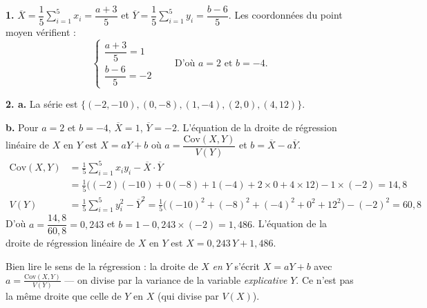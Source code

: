\documentclass[11pt]{article}
\begin{document}


\textbf{1.} $\overline{X} = \dfrac{1}{5}\displaystyle\sum_{i=1}^5 x_i = \dfrac{a + 3}{5}$ et $\overline{Y} = \dfrac{1}{5}\displaystyle\sum_{i=1}^5 y_i = \dfrac{b - 6}{5}$. Les coordonnées du point moyen vérifient :
\[ \begin{cases} \dfrac{a + 3}{5} = 1 \\[1ex] \dfrac{b - 6}{5} = -2 \end{cases} \qquad \text{D'où } a = 2 \text{ et } b = -4. \]

\textbf{2. a.} La série est $\{(-2, -10), (0, -8), (1, -4), (2, 0), (4, 12)\}$.
\begin{center}
\end{center}

\textbf{b.} Pour $a = 2$ et $b = -4$, $\overline{X} = 1$, $\overline{Y} = -2$. L'équation de la droite de régression linéaire de $X$ en $Y$ est $X = aY + b$ où $a = \dfrac{\mathrm{Cov}(X, Y)}{V(Y)}$ et $b = \overline{X} - a\overline{Y}$.
\begin{align*}
\mathrm{Cov}(X, Y) &= \frac{1}{5}\sum_{i=1}^5 x_i y_i - \overline{X}\cdot\overline{Y} \\
&= \frac{1}{5}\big((-2)(-10) + 0(-8) + 1(-4) + 2 \times 0 + 4 \times 12\big) - 1 \times (-2) = 14{,}8 \\
V(Y) &= \frac{1}{5}\sum_{i=1}^5 y_i^2 - \overline{Y}^2 = \frac{1}{5}\big((-10)^2 + (-8)^2 + (-4)^2 + 0^2 + 12^2\big) - (-2)^2 = 60{,}8
\end{align*}
D'où $a = \dfrac{14{,}8}{60{,}8} = 0{,}243$ et $b = 1 - 0{,}243 \times (-2) = 1{,}486$. L'équation de la droite de régression linéaire de $X$ en $Y$ est $X = 0{,}243\,Y + 1{,}486$.

\begin{piege}
Bien lire le sens de la régression : la droite de $X$ \emph{en} $Y$
s'écrit $X = aY + b$ avec $a = \frac{\mathrm{Cov}(X,Y)}{V(Y)}$ — on
divise par la variance de la variable \emph{explicative} $Y$. Ce n'est
pas la même droite que celle de $Y$ en $X$ (qui divise par $V(X)$).
\end{piege}
\end{document}
